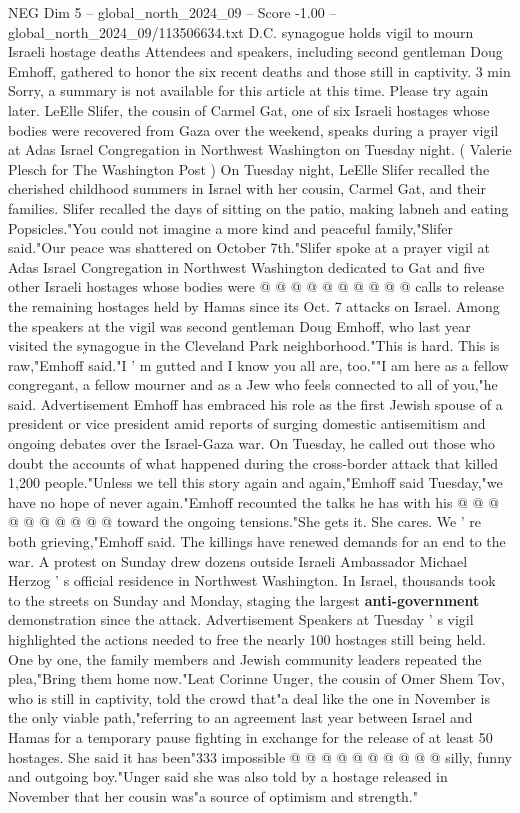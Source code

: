 \begin{textsample}{NEG Dim 5 – global\_north\_2024\_09 – Score -1.00 – global\_north\_2024\_09/113506634.txt}  \label{ex:f5_neg_092}
D.C. synagogue holds vigil to mourn Israeli hostage deaths Attendees and speakers, including second gentleman Doug Emhoff, gathered to honor the six recent deaths and those still in captivity. 3 min Sorry, a summary is not available for this article at this time.
Please try again later.
LeElle Slifer, the cousin of Carmel Gat, one of six Israeli hostages whose bodies were recovered from Gaza over the weekend, speaks during a prayer vigil at Adas Israel Congregation in Northwest Washington on Tuesday night. ( Valerie Plesch for The Washington Post ) On Tuesday night, LeElle Slifer recalled the cherished childhood summers in Israel with her cousin, Carmel Gat, and their families.
Slifer recalled the days of sitting on the patio, making labneh and eating Popsicles."You could not imagine a more kind and peaceful family,"Slifer said."Our peace was shattered on October 7th."Slifer spoke at a prayer vigil at Adas Israel Congregation in Northwest Washington dedicated to Gat and five other Israeli hostages whose bodies were @ @ @ @ @ @ @ @ @ @ calls to release the remaining hostages held by Hamas since its Oct. 7 attacks on Israel.
Among the speakers at the vigil was second gentleman Doug Emhoff, who last year visited the synagogue in the Cleveland Park neighborhood."This is hard.
This is raw,"Emhoff said."I ' m gutted and I know you all are, too.""I am here as a fellow congregant, a fellow mourner and as a Jew who feels connected to all of you,"he said.
Advertisement Emhoff has embraced his role as the first Jewish spouse of a president or vice president amid reports of surging domestic antisemitism and ongoing debates over the Israel-Gaza war.
On Tuesday, he called out those who doubt the accounts of what happened during the cross-border attack that killed 1,200 people."Unless we tell this story again and again,"Emhoff said Tuesday,"we have no hope of never again."Emhoff recounted the talks he has with his @ @ @ @ @ @ @ @ @ @ toward the ongoing tensions."She gets it.
She cares.
We ' re both grieving,"Emhoff said.
The killings have renewed demands for an end to the war.
A protest on Sunday drew dozens outside Israeli Ambassador Michael Herzog ' s official residence in Northwest Washington.
In Israel, thousands took to the streets on Sunday and Monday, staging the largest \textbf{anti-government} demonstration since the attack.
Advertisement Speakers at Tuesday ' s vigil highlighted the actions needed to free the nearly 100 hostages still being held.
One by one, the family members and Jewish community leaders repeated the plea,"Bring them home now."Leat Corinne Unger, the cousin of Omer Shem Tov, who is still in captivity, told the crowd that"a deal like the one in November is the only viable path,"referring to an agreement last year between Israel and Hamas for a temporary pause fighting in exchange for the release of at least 50 hostages.
She said it has been"333 impossible @ @ @ @ @ @ @ @ @ @ silly, funny and outgoing boy."Unger said she was also told by a hostage released in November that her cousin was"a source of optimism and strength."

\end{textsample}
